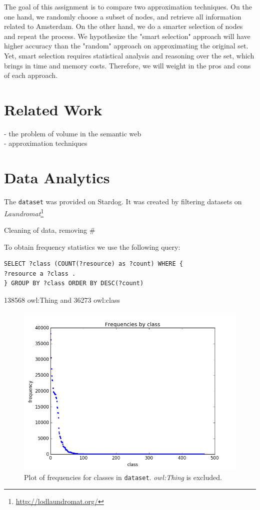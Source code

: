 \documentclass[runningheads,a4paper]{../../StyleFiles/llncs}
\begin{document}
The goal of this assignment is to compare two approximation techniques. On the one hand, we randomly choose a subset of nodes, and retrieve all information related to Amsterdam. On the other hand, we do a smarter selection of nodes and repeat the process. We hypothesize the "smart selection" approach will have higher accuracy than the "random" approach on approximating the original set. Yet, smart selection requires statistical analysis and reasoning over the set, which brings in time and memory costs. Therefore, we will weight in the pros and cons of each approach.

\section{Related Work}
- the problem of volume in the semantic web \\
- approximation techniques

\section{Data Analytics}
The \texttt{dataset} was provided on Stardog. It was created by filtering datasets on \textit{Laundromat}\footnote{\url{http://lodlaundromat.org/}}

Cleaning of data, removing \#

To obtain frequency statistics we use the following query:

\begin{lstlisting}[captionpos=b, caption=SPARQL query for getting Event witSh Location, label=lst:sparql, basicstyle=\ttfamily\small,frame=bt]
SELECT ?class (COUNT(?resource) as ?count) WHERE {
?resource a ?class . 
} GROUP BY ?class ORDER BY DESC(?count)
\end{lstlisting}

138568 owl:Thing and 36273 owl:class

\begin{figure}[h]
	\centering
	\includegraphics[width=1\textwidth]{img/dataset_frequency.png}
	\caption{Plot of frequencies for classes in \texttt{dataset}. \textit{owl:Thing} is excluded.}
	\label{fig:frequency}
\end{figure}
\end{document}
